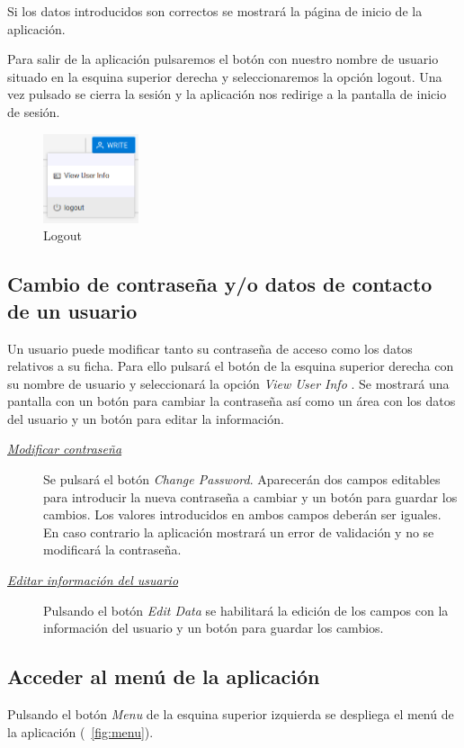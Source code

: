 Si los datos introducidos son correctos se mostrará la página de inicio de la aplicación.

Para salir de la aplicación pulsaremos el botón con nuestro nombre de usuario situado en la esquina superior derecha y seleccionaremos la opción logout. Una vez pulsado se cierra la sesión y la aplicación nos redirige a la pantalla de inicio de sesión.

\begin{figure}[H]
  \centering
  \includegraphics[width=0.25\textwidth]{imaxes/logout.png}
  \caption{Logout}
  \label{fig:login}
\end{figure}


\subsection{Cambio de contraseña y/o datos de contacto de un usuario}
\label{sub:contraseña}
Un usuario puede modificar tanto su contraseña de acceso como los datos relativos a su ficha. Para ello pulsará el botón de la esquina superior derecha con su nombre de usuario y seleccionará la opción \textit{View User Info} .
Se mostrará una pantalla con un botón para cambiar la contraseña así como un área con los datos del usuario y un botón para editar la información.

\begin{description}
\item[\underline{\textsl{Modificar contraseña}}] Se pulsará el botón \emph{Change Password}. Aparecerán dos campos editables para introducir la nueva contraseña a cambiar y un botón para guardar los cambios. Los valores introducidos en ambos campos deberán ser iguales. En caso contrario la aplicación mostrará un error de validación y no se modificará la contraseña.

\item[\underline{\textsl{Editar información del usuario}}] Pulsando el botón \emph{Edit Data} se habilitará la edición de los campos con la información del usuario y un botón para guardar los cambios.
\end{description}


\subsection{Acceder al menú de la aplicación}
\label{sub:menu}
Pulsando el botón \emph{Menu} de la esquina superior izquierda se despliega el menú de la aplicación (\figurename~\ref{fig:menu}).


